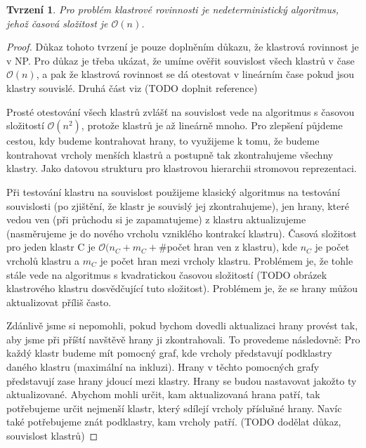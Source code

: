\documentclass[12pt,a4report]{report}
\newtheorem{tvr3}{Tvrzení}
\begin{document}
\begin{tvr3}
Pro problém klastrové rovinnosti je nedeterministický algoritmus, jehož časová složitost je $\mathcal{O}(n)$.
\end{tvr3}
\begin{proof}
\par
Důkaz tohoto tvrzení je pouze doplněním důkazu, že klastrová rovinnost je v NP. Pro důkaz je třeba ukázat, že umíme ověřit souvislost všech klastrů v čase $\mathcal{O}(n)$, a pak že klastrová rovinnost se dá otestovat v lineárním čase pokud jsou klastry souvislé.
Druhá část viz (TODO doplnit reference)
\par
Prosté otestování všech klastrů zvlášť na souvislost vede na algoritmus s časovou složitostí $\mathcal{O}(n^2)$, protože klastrů je až lineárně mnoho. Pro zlepšení půjdeme cestou, kdy budeme kontrahovat hrany, to využijeme k tomu, že budeme kontrahovat vrcholy menších klastrů a postupně tak zkontrahujeme všechny klastry. Jako datovou strukturu pro klastrovou hierarchii stromovou reprezentaci.
\par
Při testování klastru na souvislost použijeme klasický algoritmus na testování souvislosti (po zjištění, že klastr je souvislý jej zkontrahujeme), jen hrany, které vedou ven (při průchodu si je zapamatujeme) z klastru aktualizujeme (nasměrujeme je do nového vrcholu vzniklého kontrakcí klastru). Časová složitost pro jeden klastr C je $\mathcal{O}(n_C + m_C + \#$počet hran ven z klastru), kde $n_C$ je počet vrcholů klastru a $m_C$ je počet hran mezi vrcholy klastru. Problémem je, že tohle stále vede na algoritmus s kvadratickou časovou složitostí (TODO obrázek klastrového klastru dosvědčující tuto složitost). Problémem je, že se hrany můžou aktualizovat příliš často.
\par
Zdánlivě jsme si nepomohli, pokud bychom dovedli aktualizaci hrany provést tak, aby jsme při příští navštěvě hrany ji zkontrahovali. To provedeme následovně: Pro každý klastr budeme mít pomocný graf, kde vrcholy představují podklastry daného klastru (maximální na inkluzi). Hrany v těchto pomocných grafy představují zase hrany jdoucí mezi klastry. Hrany se budou nastavovat jakožto ty aktualizované. Abychom mohli určit, kam aktualizovaná hrana patří, tak potřebujeme určit nejmenší klastr, který sdílejí vrcholy příslušné hrany. Navíc také potřebujeme znát podklastry, kam vrcholy patří.
(TODO dodělat důkaz, souvislost klastrů)
\end{proof}
\end{document}
